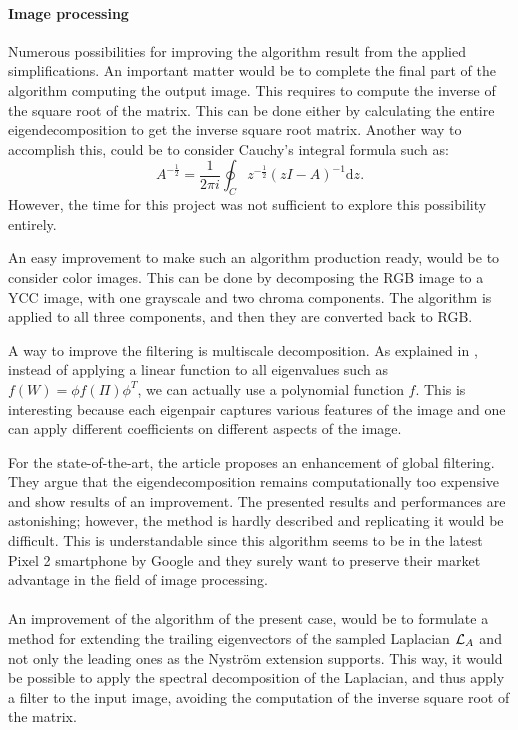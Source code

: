 \paragraph{Image processing}
Numerous possibilities for improving the algorithm result from the applied simplifications.
An important matter would be to complete the final part of the algorithm computing the output image.
This requires to compute the inverse of the square root of the matrix.
\ifthesis
 This can be done either by calculating the entire eigendecomposition to get the inverse square root matrix.
 Another way to accomplish this, could be to consider Cauchy's integral formula such as:
 \[A^{-\frac{1}{2}} = \frac{1}{2\pi i} \oint_C z^{-\frac{1}{2}} (zI - A)^{-1} \mathrm{d}z.\]
 However, the time for this project was not sufficient to explore this possibility entirely.

 An easy improvement to make such an algorithm production ready, would be to consider color images.
 This can be done by decomposing the RGB image to a YCC image, with one grayscale and two chroma components.
 The algorithm is applied to all three components, and then they are converted back to RGB.
\fi

A way to improve the filtering is multiscale decomposition.
As explained in \cite{talebi_nonlocal_2014}, instead of applying a linear function to all eigenvalues such as \(f(W) = \phi f(\Pi) \phi^T\), we can actually use a polynomial function \(f\).
This is interesting because each eigenpair captures various features of the image and one can apply different coefficients on different aspects of the image.

For the state-of-the-art, the article \cite{talebi_fast_2016} proposes an enhancement of global filtering.
They argue that the eigendecomposition remains computationally too expensive and show results of an improvement.
The presented results and performances are astonishing; however, the method is hardly described and replicating it would be difficult.
This is understandable since this algorithm seems to be in the latest Pixel 2 smartphone by Google and they surely want to preserve their market advantage in the field of image processing.

\paragraph{}
An improvement of the algorithm of the present case, would be to formulate a method for extending the trailing eigenvectors of the sampled Laplacian \(\operatorname{\mathcal{L}}_A\) and not only the leading ones as the Nystr\"om extension supports.
This way, it would be possible to apply the spectral decomposition of the Laplacian, and thus apply a filter to the input image, avoiding the computation of the inverse square root of the matrix.

